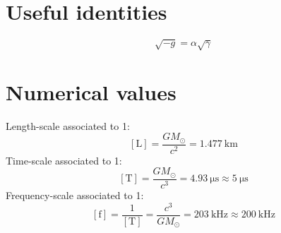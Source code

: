 \documentclass[]{scrartcl}
\begin{document}
\section{Useful identities}
\label{sec:useful-identities}

\begin{equation}
  \label{eq:3}
  \sqrt{-g} = \alpha \sqrt{\gamma}
\end{equation}

\section{Numerical values}
\label{sec:numerical-values}

Length-scale associated to \SI{1}{\sunmass}:
\begin{equation}
  \label{eq:length-1-Msun}
  [\textrm{L}] = \frac{GM_{\odot}}{c^{2}} = \SI{1.477}{\km}
\end{equation}
Time-scale associated to \SI{1}{\sunmass}:
\begin{equation}
  \label{eq:length-1-Msun}
  [\textrm{T}] = \frac{GM_{\odot}}{c^{3}} = \SI{4.93}{\micro\s} \approx \SI{5}{\micro\s}
\end{equation}
Frequency-scale associated to \SI{1}{\sunmass}:
\begin{equation}
  \label{eq:length-1-Msun}
  [\textrm{f}] = \frac{1}{[\textrm{T}]} = \frac{c^{3}}{GM_{\odot}} = \SI{203}{\kilo\Hz} \approx \SI{200}{\kilo\Hz}
\end{equation}
\end{document}
